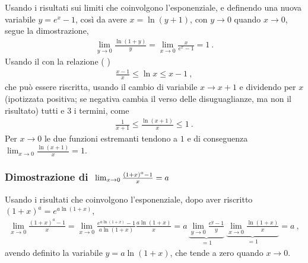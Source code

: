 \documentclass[letterpaper,10pt,italian]{jupyterBook}
\begin{document}
\sphinxAtStartPar
{} Usando i risultati sui limiti che coinvolgono l’esponenziale, e definendo una nuova variabile \(y = e^x - 1\), così da avere \(x = \ln (y+1)\), con \(y \rightarrow 0\) quando \(x \rightarrow 0\), segue la dimostrazione,
\begin{equation*}
\begin{split}\lim_{y \rightarrow 0} \frac{\ln(1+y)}{y} = \lim_{x \rightarrow 0} \frac{x}{e^x-1} = 1 \ .\end{split}
\end{equation*}
\sphinxAtStartPar
{} Usando il {\hyperref[\detokenize{ch/infinitesimal_calculus/analysis:infinitesimal-calculus-limits-thms-comparison}]{}} con la relazione ( )
\begin{equation*}
\begin{split}\frac{x-1}{x} \le \ln x \le x - 1 \ ,\end{split}
\end{equation*}
\sphinxAtStartPar
che può essere riscritta, usando il cambio di variabile \(x \rightarrow x+1\) e dividendo per \(x\) (ipotizzata positiva; se negativa cambia il verso delle disuguaglianze, ma non il risultato) tutti e 3 i termini, come
\begin{equation*}
\begin{split}\frac{1}{x+1} \le \frac{\ln (x + 1)}{x} \le 1 \ .\end{split}
\end{equation*}
\sphinxAtStartPar
Per \(x \rightarrow 0\) le due funzioni estremanti tendono a \(1\) e di conseguenza \(\lim_{x \rightarrow 0} \frac{\ln (x+1)}{x} = 1\).
\subsubsection*{Dimostrazione di \protect\(\ \lim_{x \rightarrow 0} \frac{(1+x)^a - 1}{x} = a \protect\)}

\sphinxAtStartPar
Usando i risultati che coinvolgono l’esponenziale, dopo aver riscritto \((1+x)^a = e^{a \ln(1+x)}\),
\begin{equation*}
\begin{split} \lim_{x \rightarrow 0} \frac{(1+x)^a - 1}{x} = \lim_{x \rightarrow 0} \frac{e^{a \ln(1+x)} - 1}{a \ln (1+x)} \frac{a \ln(1+x)}{x} = a \, \underbrace{\lim_{y \rightarrow 0} \frac{e^y - 1}{y}}_{=1} \ \underbrace{\lim_{x \rightarrow 0} \frac{\ln(1+x)}{x}}_{=1} = a \ , \end{split}
\end{equation*}
\sphinxAtStartPar
avendo definito la variabile \(y = a \ln (1+x)\), che tende a zero quando \(x \rightarrow 0\).  
\end{document}
